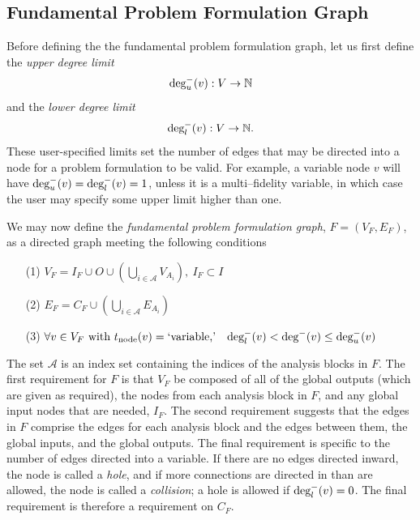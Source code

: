 \subsection{Fundamental Problem Formulation Graph}
Before defining the the fundamental problem formulation graph, let us first define the \emph{upper degree limit} 
\begin{equation}
\textrm{deg}_u^-(v):V \to \mathbb{N}
\end{equation} 
and the \emph{lower degree limit}
\begin{equation}
\textrm{deg}_l^-(v):V \to \mathbb{N}.
\end{equation}
These user-specified limits set the number of edges that may be directed into a node for a problem formulation to be valid. For example, a variable node $v$ will have $\textrm{deg}_u^-(v) = \textrm{deg}_l^-(v) = 1$, unless it is a multi--fidelity variable, in which case the user may specify some upper limit higher than one.

We may now define the \emph{fundamental problem formulation graph}, $F=(V_F,E_F)$, as a directed graph meeting the following conditions
\begin{enumerate}
\item[(1)] $\displaystyle{V_F = I_F \cup O \cup \left( \bigcup_{i \in \mathcal A} V_{A_i} \right),\ I_F \subset I}$
\item[(2)] $\displaystyle{E_F = C_F \cup \left( \bigcup_{i \in \mathcal A} E_{A_i} \right)}$
\item[(3)] $\displaystyle{\forall v \in V_F \textrm{ with } t_\textrm{node}(v) = \textrm{`variable,'}\quad \textrm{deg}_l^-(v) < \textrm{deg}^-(v) \leq \textrm{deg}_u^-(v)}$
\end{enumerate}
The set $\mathcal A$ is an index set containing the indices of the analysis blocks in $F$. The first requirement for $F$ is that $V_F$ be composed of all of the global outputs (which are given as required), the nodes from each analysis block in $F$, and any global input nodes that are needed, $I_F$. The second requirement suggests that the edges in $F$ comprise the edges for each analysis block and the edges between them, the global inputs, and the global outputs. The final requirement is specific to the number of edges directed into a variable. If there are no edges directed inward, the node is called a \emph{hole}, and if more connections are directed in than are allowed, the node is called a \emph{collision}; a hole is allowed if $\textrm{deg}_l^-(v)=0$. The final requirement is therefore a requirement on $C_F$.


